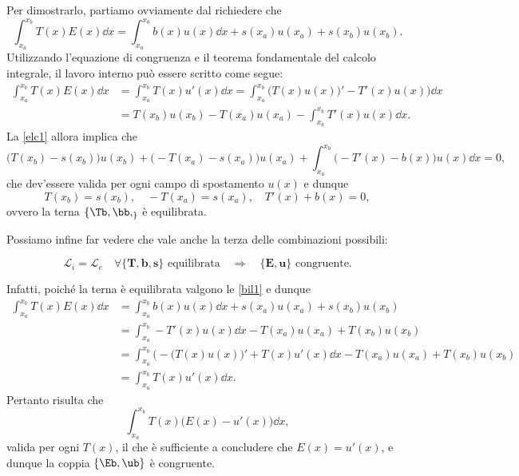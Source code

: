Per dimostrarlo, partiamo ovviamente dal richiedere che 
\begin{equation}\label{elc1}
\int_{x_a}^{x_b}T(x) E(x)\dd x=\int_{x_a}^{x_b}b(x)u(x)\dd x+s(x_a)u(x_a)+s(x_b)u(x_b).
\end{equation}
Utilizzando l'equazione di congruenza e il teorema fondamentale del calcolo integrale,  il lavoro interno può essere scritto come segue:
\begin{equation}
	\begin{aligned}
	\int_{x_a}^{x_b}T(x) E(x)\dd x&=\int_{x_a}^{x_b}T(x) u'(x)\dd x=	\int_{x_a}^{x_b}\big( T(x)u(x)   \big)'-T'(x)u(x)\big)\dd x\\
	&=T(x_b)u(x_b)-T(x_a)u(x_a)-\int_{x_a}^{x_b}T'(x)u(x)\dd x.
	\end{aligned}
\end{equation}
La \eqref{elc1} allora implica che
\begin{equation}
\big( T(x_b)-s(x_b) \big)u(x_b)+\big( -T(x_a)-s(x_a) \big)u(x_a)+\int_{x_a}^{x_b}\big(  -T'(x) -b(x)\big)u(x) \dd x=0,
\end{equation}
che dev'essere valida per ogni campo di spostamento $u(x)$ e dunque
\begin{equation}
T(x_b)=s(x_b), \quad -T(x_a)=s(x_a), \quad T'(x) +b(x)=0,
\end{equation}
ovvero la terna $\{\Tb, \bb, \sb\}$ è equilibrata.

Possiamo infine far vedere che vale anche la terza delle combinazioni possibili:
\begin{definition}
	\begin{equation}
	\mathcal{L}_i=\mathcal{L}_e\quad\forall\{\mathbf{T},\mathbf{b},\mathbf{s}\}\text{ equilibrata}\quad\Longrightarrow\quad\{\mathbf{E},\mathbf{u}\}\text{ congruente.}
\end{equation}
\end{definition}
Infatti, poiché la terna è equilibrata valgono le \eqref{bil1} e dunque
\begin{equation}
	\begin{aligned}
\int_{x_a}^{x_b}T(x)E(x)\dd x&=\int_{x_a}^{x_b}b(x)u(x)\dd x+s(x_a)u(x_a)+s(x_b)u(x_b)\\
&=\int_{x_a}^{x_b}-T'(x)u(x)\dd x-T(x_a)u(x_a)+T(x_b)u(x_b)\\
&=\int_{x_a}^{x_b}\big(-\big( T(x)u(x) \big)'+T(x)u'(x)\dd x-T(x_a)u(x_a)+T(x_b)u(x_b)\\
&=\int_{x_a}^{x_b}T(x)u'(x)\dd x.
\end{aligned}
\end{equation}
Pertanto risulta che
\begin{equation}
\int_{x_a}^{x_b}T(x)\big(E(x)-u'(x)\big)\dd x,
\end{equation}
valida per ogni $T(x)$, il che è sufficiente a concludere che $E(x)=u'(x)$, e dunque la coppia $\{\Eb, \ub\}$ è congruente.


